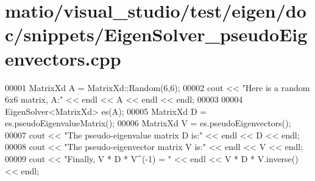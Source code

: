 \hypertarget{matio_2visual__studio_2test_2eigen_2doc_2snippets_2_eigen_solver__pseudo_eigenvectors_8cpp_source}{}\section{matio/visual\+\_\+studio/test/eigen/doc/snippets/\+Eigen\+Solver\+\_\+pseudo\+Eigenvectors.cpp}
\label{matio_2visual__studio_2test_2eigen_2doc_2snippets_2_eigen_solver__pseudo_eigenvectors_8cpp_source}

\begin{DoxyCode}
00001 MatrixXd A = MatrixXd::Random(6,6);
00002 cout << \textcolor{stringliteral}{"Here is a random 6x6 matrix, A:"} << endl << A << endl << endl;
00003 
00004 EigenSolver<MatrixXd> es(A);
00005 MatrixXd D = es.pseudoEigenvalueMatrix();
00006 MatrixXd V = es.pseudoEigenvectors();
00007 cout << \textcolor{stringliteral}{"The pseudo-eigenvalue matrix D is:"} << endl << D << endl;
00008 cout << \textcolor{stringliteral}{"The pseudo-eigenvector matrix V is:"} << endl << V << endl;
00009 cout << \textcolor{stringliteral}{"Finally, V * D * V^(-1) = "} << endl << V * D * V.inverse() << endl;
\end{DoxyCode}
